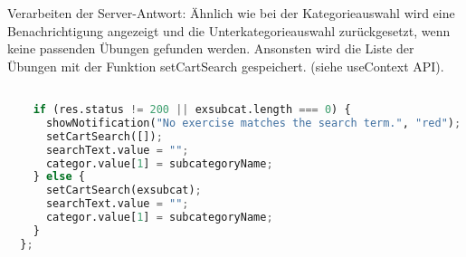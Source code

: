 \documentclass[12pt,a4paper]{article} %
\begin{document}
Verarbeiten der Server-Antwort: Ähnlich wie bei der Kategorieauswahl wird eine Benachrichtigung angezeigt und die Unterkategorieauswahl zurückgesetzt, wenn keine passenden Übungen gefunden werden. Ansonsten wird die Liste der Übungen mit der Funktion setCartSearch gespeichert. (siehe useContext API).


\begin{lstlisting}[language=Python]

    if (res.status != 200 || exsubcat.length === 0) {
      showNotification("No exercise matches the search term.", "red");
      setCartSearch([]);
      searchText.value = "";
      categor.value[1] = subcategoryName;
    } else {
      setCartSearch(exsubcat);
      searchText.value = "";
      categor.value[1] = subcategoryName;
    }
  };
\end{lstlisting}
\end{document}
